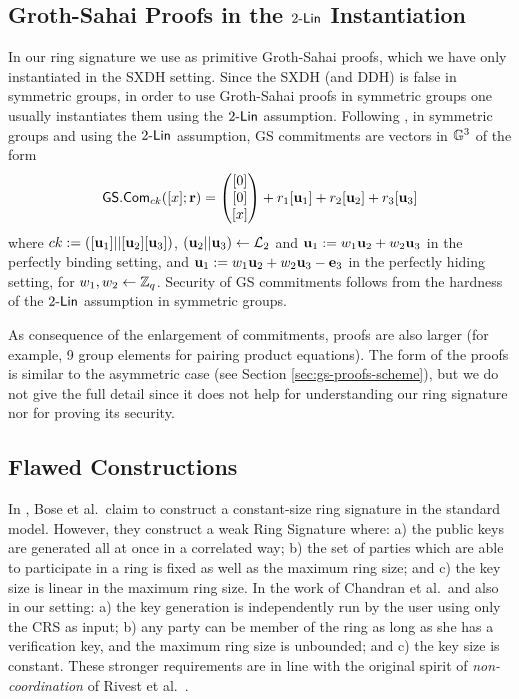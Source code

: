 \subsection{Groth-Sahai Proofs in the $2\mbox{-}\mathsf{Lin}$ Instantiation}
In our ring signature we use as primitive Groth-Sahai proofs, which we have only instantiated in the SXDH setting. Since the SXDH (and DDH) is false in symmetric groups, in order to use Groth-Sahai proofs in symmetric groups one usually instantiates them using the $2\mbox{-}\mathsf{Lin}$ assumption. Following \cite{EC:GroSah08}, in symmetric groups and using the $2\mbox{-}\mathsf{Lin}$ assumption, GS commitments are vectors in $\mathbb{G}^3$ of the form
$$
{\mathsf{GS}}.\mathsf{Com}_{ck}([x];\mathbf{r})=\left(\begin{matrix}{[0]}\\{[0]}\\{[x]}\end{matrix}\right)+r_1[\mathbf{u}_1]+{r}_2[\mathbf{u}_2]+r_3[\mathbf{u}_3]
$$
where $ck:=([\mathbf{u}_1]||[\mathbf{u}_2][\mathbf{u}_3])$, $(\mathbf{u}_2||\mathbf{u}_3)\gets\mathcal{L}_2$ and $\mathbf{u}_1:=w_1\mathbf{u}_2+w_2\mathbf{u}_3$ in the perfectly binding setting, and $\mathbf{u}_1:=w_1\mathbf{u}_2+w_2\mathbf{u}_3-\mathbf{e}_3$ in the perfectly hiding setting, for $w_1,w_2\gets\mathbb{Z}_q$. Security of GS commitments follows from the hardness of the $2\mbox{-}\mathsf{Lin}$ assumption in symmetric groups.

As consequence of the enlargement of commitments, proofs are also larger (for example, 9 group elements for pairing product equations). The form of the proofs is similar  to the asymmetric case (see Section \ref{sec:gs-proofs-scheme}), but we do not give the full detail since it does not help for understanding our ring signature nor for proving its security. 


\subsection{Flawed Constructions}\label{sec:rs-flawed}
In \cite{ACISP:BosDasRan15}, Bose et al.~claim to construct a constant-size ring signature in the standard model. However, they construct a weak Ring Signature where: a) the public keys are generated all at once in a correlated way; b) the set of parties which are able to participate in a ring is fixed as well as the maximum ring size; and c) the key size is linear in the maximum ring size. In the work of Chandran et al.~and also in our setting: a) the key generation is independently run by the user using only the CRS as input; b) any party can be member of the ring as long as she has a verification key, and the maximum ring size is unbounded; and c) the key size is constant. These stronger requirements are in line with the original spirit of \emph{non-coordination} of  Rivest et al.~\cite{AC:RivShaTau01}.

